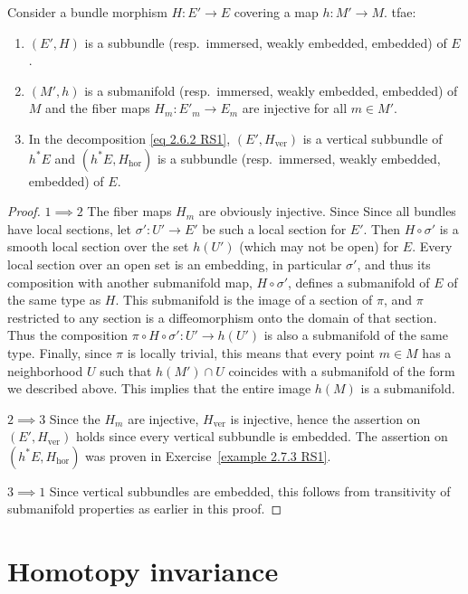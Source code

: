 \begin{prop}[{{\cite[Prop.~2.7.4]{RS1}}}]
    Consider a bundle morphism $H:E'\to E$ covering a map $h:M'\to M$.  \gls{tfae}:
    \begin{enumerate}
        \item $(E',H)$ is a subbundle (resp.~immersed, weakly embedded, embedded) of $E$.
        \item $(M',h)$ is a submanifold (resp.~immersed, weakly embedded, embedded) of $M$ and the fiber maps $H_m:E'_m\to E_m$ are injective for all $m\in M'$.
        \item In the decomposition \eqref{eq 2.6.2 RS1}, $(E',H_{\mathrm{ver}})$ is a vertical subbundle of $h^\ast E$ and $(h^\ast E,H_{\mathrm{hor}})$ is a subbundle (resp.~immersed, weakly embedded, embedded) of $E$.
    \end{enumerate}
\end{prop}
\begin{proof}
    $1\implies 2$ The fiber maps $H_m$ are obviously injective. Since Since all bundles have local sections, let $\sigma':U'\to E'$ be such a local section for $E'$. Then $H\circ\sigma'$ is a smooth local section over the set $h(U')$ (which may not be open) for $E$. Every local section over an open set is an embedding, in particular $\sigma'$, and thus its composition with another submanifold map, $H\circ \sigma'$, defines a submanifold of $E$ of the same type as $H$. This submanifold is the image of a section of $\pi$, and $\pi$ restricted to any section is a diffeomorphism onto the domain of that section. Thus the composition $\pi\circ H\circ \sigma':U'\to h(U')$ is also a submanifold of the same type. Finally, since $\pi$ is locally trivial, this means that every point $m\in M$ has a neighborhood $U$ such that $h(M')\cap U$ coincides with a submanifold of the form we described above. This implies that the entire image $h(M)$ is a submanifold.
    
    $2\implies 3$ Since the $H_m$ are injective, $H_{\mathrm{ver}}$ is injective, hence the assertion on $(E',H_{\mathrm{ver}})$ holds since every vertical subbundle is embedded. The assertion on $(h^\ast E,H_{\mathrm{hor}})$ was proven in Exercise~\ref{example 2.7.3 RS1}.

    $3\implies 1$ Since vertical subbundles are embedded, this follows from transitivity of submanifold properties as earlier in this proof.
\end{proof}




\section{Homotopy invariance}


